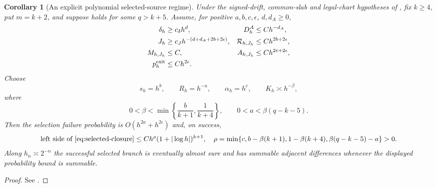 \documentclass[11pt]{article}
\numberwithin{equation}{section}
\newtheorem{corollary}[corollary]{Corollary}
\theoremstyle{definition}
\theoremstyle{remark}
\begin{document}
\begin{corollary}[An explicit polynomial selected-source regime]
\label{cor:selected-polynomial}
Under the signed-drift, common-slab and legal-chart hypotheses of , fix $k\ge4$, put $m=k+2$, and suppose  holds for some $q>k+5$.  Assume, for positive $a,b,c,\epsilon$, $d,d_A\ge0$,
\begin{align}
 \delta_h&\ge c_\delta h^d,& D_h^A&\le Ch^{-d_A},\notag\\
 J_h&\ge c_Jh^{-(d+d_A+2b+2\epsilon)},&
 \mathcal R_{h,J_h}&\le Ch^{2b+2\epsilon},\notag\\
 M_{h,J_h}&\le C,& A_{h,J_h}&\le Ch^{2c+2\epsilon},\notag\\
 p_h^{\rm exit}&\le Ch^{2\epsilon}.&&
 \label{eq:selected-polynomial-source}
\end{align}
Choose
\begin{equation}
 s_h=h^b,\qquad R_h=h^{-a},\qquad \alpha_h=h^c,
 \qquad K_h\asymp h^{-\beta},
 \label{eq:selected-polynomial-thresholds}
\end{equation}
where
\begin{equation}
 0<\beta<\min\left\{\frac{b}{k+1},\frac1{k+4}\right\},
 \qquad 0<a<\beta(q-k-5).
 \label{eq:selected-polynomial-window}
\end{equation}
Then the selection failure probability is $O(h^{2a}+h^{2\epsilon})$ and, on success,
\begin{equation}
 \text{left side of \eqref{eq:selected-closure}}
 \le C h^\rho(1+|\log h|)^{k+1},
 \quad
 \rho=\min\{c,b-\beta(k+1),1-\beta(k+4),\beta(q-k-5)-a\}>0.
 \label{eq:selected-polynomial-rate}
\end{equation}
Along $h_n\asymp2^{-n}$ the successful selected branch is eventually almost sure and has summable adjacent differences whenever the displayed probability bound is summable.
\end{corollary}
\begin{proof}
See .
\end{proof}
\end{document}
